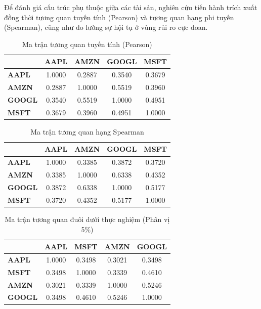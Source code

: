 Để đánh giá cấu trúc phụ thuộc giữa các tài sản, nghiên cứu tiến hành trích xuất đồng thời tương quan tuyến tính (Pearson) và tương quan hạng phi tuyến (Spearman), cũng như đo lường sự hội tụ ở vùng rủi ro cực đoan.

\begin{table}[H]
\centering
\caption{Ma trận tương quan tuyến tính (Pearson)}
\begin{tabular}{|l|c|c|c|c|}
\hline
 & \textbf{AAPL} & \textbf{AMZN} & \textbf{GOOGL} & \textbf{MSFT} \\
\hline
\textbf{AAPL} & 1.0000 & 0.2887 & 0.3540 & 0.3679 \\
\textbf{AMZN} & 0.2887 & 1.0000 & 0.5519 & 0.3960 \\
\textbf{GOOGL} & 0.3540 & 0.5519 & 1.0000 & 0.4951 \\
\textbf{MSFT}& 0.3679 & 0.3960 & 0.4951 & 1.0000 \\
\hline
\end{tabular}
\label{tab:pearson}
\end{table}

\begin{table}[H]
\centering
\caption{Ma trận tương quan hạng Spearman}
\begin{tabular}{|l|c|c|c|c|}
\hline
 & \textbf{AAPL} & \textbf{AMZN} & \textbf{GOOGL} & \textbf{MSFT} \\
\hline
\textbf{AAPL} & 1.0000 & 0.3385 & 0.3872 & 0.3720 \\
\textbf{AMZN} & 0.3385 & 1.0000 & 0.6338 & 0.4352 \\
\textbf{GOOGL} & 0.3872 & 0.6338 & 1.0000 & 0.5177 \\
\textbf{MSFT}& 0.3720 & 0.4352 & 0.5177 & 1.0000 \\
\hline
\end{tabular}
\label{tab:spearman}
\end{table}

\begin{table}[H]
    \centering
    \caption{Ma trận tương quan đuôi dưới thực nghiệm (Phân vị 5\%)}
    \vspace{0.2cm}
    \begin{tabular}{|l|c|c|c|c|}
        \hline
        & \textbf{AAPL} & \textbf{MSFT} & \textbf{AMZN} & \textbf{GOOGL} \\
        \hline
        \textbf{AAPL}  & 1.0000 & 0.3498 & 0.3021 & 0.3498 \\
        \textbf{MSFT}  & 0.3498 & 1.0000 & 0.3339 & 0.4610 \\
        \textbf{AMZN}  & 0.3021 & 0.3339 & 1.0000 & 0.5246 \\
        \textbf{GOOGL} & 0.3498 & 0.4610 & 0.5246 & 1.0000 \\
        \hline
    \end{tabular}
    \label{tab:tail_corr}
\end{table}

